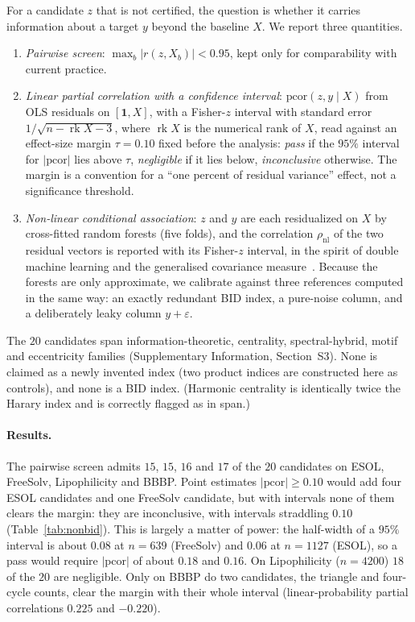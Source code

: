 \documentclass[11pt,a4paper]{article}
\theoremstyle{definition}
\newcommand{\pcor}{\mathrm{pcor}}
\begin{document}
For a candidate $z$ that is not certified, the question is whether it
carries information about a target $y$ beyond the baseline $X$. We
report three quantities.
\begin{enumerate}[label=(\alph*)]
\item \emph{Pairwise screen}: $\max_b|r(z,X_b)|<0.95$, kept only for
comparability with current practice.
\item \emph{Linear partial correlation with a confidence interval}:
$\pcor(z,y\mid X)$ from OLS residuals on $[\mathbf 1,X]$, with a
Fisher-$z$ interval with standard error $1/\sqrt{n-\operatorname{rk}X-3}$,
where $\operatorname{rk}X$ is the numerical rank of $X$, read against an
effect-size margin $\tau=0.10$ fixed before the analysis: \emph{pass}
if the $95\%$ interval for $|\pcor|$ lies above $\tau$,
\emph{negligible} if it lies below, \emph{inconclusive} otherwise.
The margin is a convention for a ``one percent of residual variance''
effect, not a significance threshold.
\item \emph{Non-linear conditional association}: $z$ and $y$ are each
residualized on $X$ by cross-fitted random forests (five folds), and
the correlation $\rho_{\mathrm{nl}}$ of the two residual vectors is
reported with its Fisher-$z$ interval, in the spirit of
double machine learning and the generalised covariance
measure~\cite{Chernozhukov2018DML,ShahPeters2020GCM}. Because the
forests are only approximate, we calibrate against three references
computed in the same way: an exactly redundant BID index, a pure-noise
column, and a deliberately leaky column $y+\varepsilon$.
\end{enumerate}

The $20$ candidates span information-theoretic, centrality,
spectral-hybrid, motif and eccentricity families
(Supplementary Information, Section~S3). None is claimed as a newly
invented index (two product indices are constructed here as controls),
and none is a BID index. (Harmonic centrality is identically twice the Harary
index and is correctly flagged as in span.)



\paragraph{Results.} The pairwise screen admits $15$, $15$, $16$ and
$17$ of the $20$ candidates on ESOL, FreeSolv, Lipophilicity and BBBP.
Point estimates $|\pcor|\ge0.10$ would add four ESOL candidates and
one FreeSolv candidate, but with intervals none of them clears the
margin: they are inconclusive, with intervals straddling $0.10$
(Table~\ref{tab:nonbid}). This is largely a matter of power: the
half-width of a $95\%$ interval is about $0.08$ at $n=639$ (FreeSolv)
and $0.06$ at $n=1127$ (ESOL), so a pass would require $|\pcor|$ of
about $0.18$ and $0.16$. On Lipophilicity ($n=4200$) $18$ of the $20$
are negligible. Only on BBBP do two candidates, the triangle and
four-cycle counts, clear the margin with their whole interval
(linear-probability partial correlations $0.225$ and $-0.220$).
\end{document}
